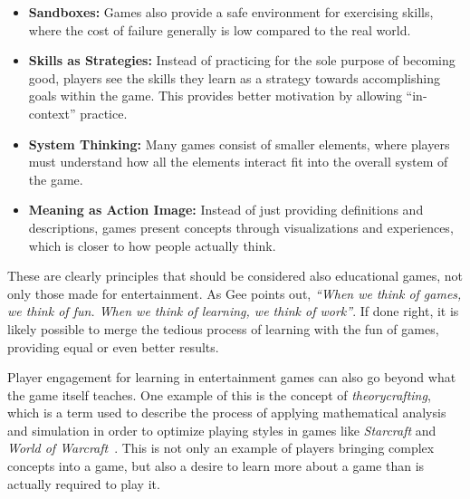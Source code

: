 \begin{itemize}
	\item{\textbf{Sandboxes:}} Games also provide a safe environment for exercising skills, where the cost of failure generally is low compared to the real world.
	\item{\textbf{Skills as Strategies:}} Instead of practicing for the sole purpose of becoming good, players see the skills they learn as a strategy towards accomplishing goals within the game. This provides better motivation by allowing ``in-context'' practice.
	\item{\textbf{System Thinking:}} Many games consist of smaller elements, where players must understand how all the elements interact fit into the overall system of the game.
	\item{\textbf{Meaning as Action Image:}} Instead of just providing definitions and descriptions, games present concepts through visualizations and experiences, which is closer to how people actually think.
\end{itemize}

\noindent
These are clearly principles that should be considered also educational games, not only those made for entertainment. As Gee points out, \emph{``When we think of games, we think of fun. When we think of learning, we think of work''}. If done right, it is likely possible to merge the tedious process of learning with the fun of games, providing equal or even better results.

\noindent
Player engagement for learning in entertainment games can also go beyond what the game itself teaches. One example of this is the concept of \emph{theorycrafting}, which is a term used to describe the process of applying mathematical analysis and simulation in order to optimize playing styles in games like \emph{Starcraft} and \emph{World of Warcraft}~\cite{paul:theorycrafting}. This is not only an example of players bringing complex concepts into a game, but also a desire to learn more about a game than is actually required to play it.

